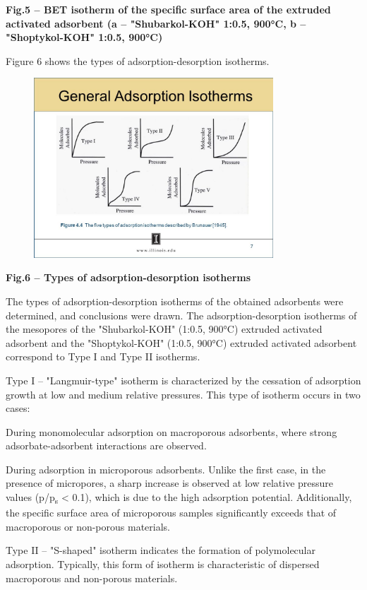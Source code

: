 {\bfseries Fig.5 -- BET isotherm of the specific surface area of the
extruded activated adsorbent (a -- "Shubarkol-KOH" 1:0.5, 900°C, b --
"Shoptykol-KOH" 1:0.5, 900°C)}

Figure 6 shows the types of adsorption-desorption isotherms.


\begin{figure}[H]
	\centering
	\includegraphics[width=0.8\textwidth]{media/chem2/image23}
	\caption*{}
\end{figure}


{\bfseries Fig.6 -- Types of adsorption-desorption isotherms}

The types of adsorption-desorption isotherms of the obtained adsorbents
were determined, and conclusions were drawn. The adsorption-desorption
isotherms of the mesopores of the "Shubarkol-KOH" (1:0.5, 900°C)
extruded activated adsorbent and the "Shoptykol-KOH" (1:0.5, 900°C)
extruded activated adsorbent correspond to Type I and Type II isotherms.

Type I -- "Langmuir-type" isotherm is characterized by the cessation of
adsorption growth at low and medium relative pressures. This type of
isotherm occurs in two cases:

During monomolecular adsorption on macroporous adsorbents, where strong
adsorbate-adsorbent interactions are observed.

During adsorption in microporous adsorbents. Unlike the first case, in
the presence of micropores, a sharp increase is observed at low relative
pressure values (p/p\textsubscript{s} \textless{} 0.1), which is due to
the high adsorption potential. Additionally, the specific surface area
of microporous samples significantly exceeds that of macroporous or
non-porous materials.

Type II -- "S-shaped" isotherm indicates the formation of polymolecular
adsorption. Typically, this form of isotherm is characteristic of
dispersed macroporous and non-porous materials.

